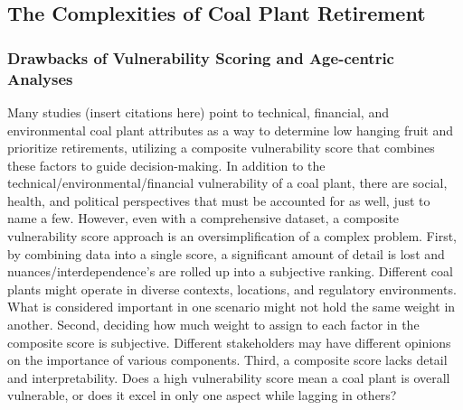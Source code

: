     



\subsection{The Complexities of Coal Plant Retirement}

\subsubsection{Drawbacks of Vulnerability Scoring and Age-centric Analyses}

Many studies (insert citations here) point to technical, financial, and environmental 
coal plant attributes as a way to determine low hanging fruit and prioritize retirements, utilizing a composite vulnerability score that combines these factors to guide 
decision-making. In addition to the technical/environmental/financial vulnerability of a coal plant, there are social, health, and political perspectives that must be accounted for as well, just 
to name a few. However, even with a comprehensive dataset, a composite vulnerability score approach is an oversimplification of a complex problem.
First, by combining data into a single score, a significant amount of detail is lost and nuances/interdependence's are rolled up into a subjective 
ranking. Different coal plants might operate in diverse contexts, locations, and regulatory environments. What is considered important in 
one scenario might not hold the same weight in another. Second, deciding how much weight to assign to each factor in the composite score is subjective. Different stakeholders may have 
different opinions on the importance of various components. Third, a composite score lacks detail and interpretability. Does a high vulnerability score mean a coal plant is 
overall vulnerable, or does it excel in only one aspect while lagging in others?
